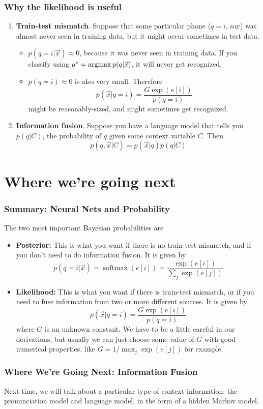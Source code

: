 \documentclass{beamer}
\newcommand{\argmax}{\operatornamewithlimits{argmax}}
\DeclareMathOperator*{\softmax}{softmax}
\begin{document}
\begin{frame}
  \frametitle{Why the likelihood is useful}

  \begin{enumerate}
  \item {\bf Train-test mismatch}.  Suppose that some particular phone
    ($q=i$, say) was almost never seen in training data, but it might
    occur sometimes in test data.
    \begin{itemize}
    \item $p(q=i|\vec{x})\approx 0$, because it was never seen in
      training data. If you classify using $q^*=\argmax p(q|\vec{x})$,
      it will never get recognized.
    \item $p(q=i)\approx 0$ is also very small. Therefore
      $$p(\vec{x}|q=i) = \frac{G\exp(e[i])}{p(q=i)}$$ might be
      reasonably-sized, and might sometimes get recognized.
    \end{itemize}
  \item {\bf Information fusion}.  Suppose you have a language model
    that tells you $p(q|C)$, the probability of $q$ given some context
    variable $C$.  Then
    \begin{displaymath}
      p(q,\vec{x}|C) = p(\vec{x}|q)p(q|C)
    \end{displaymath}
  \end{enumerate}
\end{frame}

\section[Summary]{Where we're going next}
\setcounter{subsection}{1}

\begin{frame}
  \frametitle{Summary: Neural Nets and Probability}

  The two most important Bayesian probabilities are
  \begin{itemize}
  \item {\bf Posterior:} This is what you want if there is no
    train-test mismatch, and if you don't need to do information
    fusion.  It is given by
    \begin{displaymath}
      p(q=i|\vec{x})=\softmax(e[i]) = \frac{\exp(e[i])}{\sum_j \exp(e[j])}
    \end{displaymath}
  \item {\bf Likelihood:} This is what you want if there is train-test
    mismatch, or if you need to fuse information from two or more
    different sources.  It is given by
    \begin{displaymath}
      p(\vec{x}|q=i) = \frac{G\exp(e[i])}{p(q=i)}
    \end{displaymath}
    where $G$ is an unknown constant.  
    We have to be a little careful in our derivations, but usually we
    can just choose some value of $G$ with good numerical properties,
    like $G=1/\max_j \exp(e[j])$ for example.
  \end{itemize}
\end{frame}

\begin{frame}
  \frametitle{Where We're Going Next: Information Fusion}

  Next time, we will talk about a particular type of context
  information: the pronunciation model and language model, in the form
  of a hidden Markov model.
\end{frame}
\end{document}
